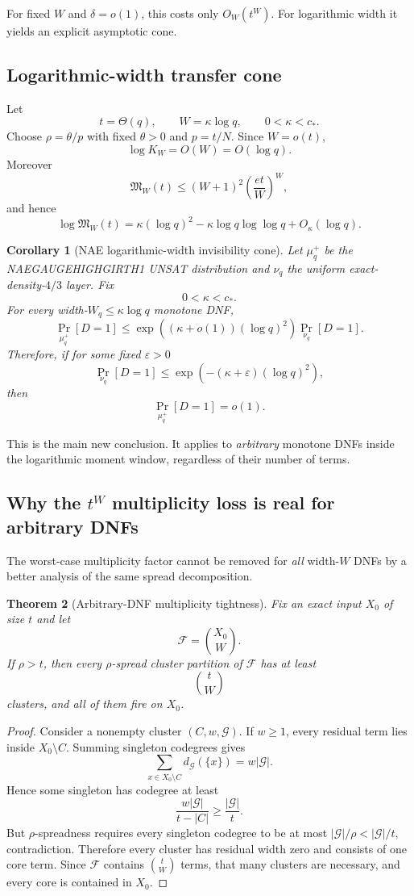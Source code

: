 \documentclass[11pt]{article}
\newtheorem{theorem}{Theorem}
\newtheorem{corollary}[theorem]{Corollary}
\begin{document}
For fixed $W$ and $\delta=o(1)$, this costs only $O_W(t^W)$. For logarithmic width it yields an explicit asymptotic cone.

\subsection{Logarithmic-width transfer cone}
Let
\[
t=\Theta(q),\qquad W=\kappa\log q,\qquad 0<\kappa<c_*.
\]
Choose $\rho=\theta/p$ with fixed $\theta>0$ and $p=t/N$. Since $W=o(t)$,
\[
\log K_W=O(W)=O(\log q).
\]
Moreover
\[
\mathfrak M_W(t)
\le
(W+1)^2\left(\frac{et}{W}\right)^W,
\]
and hence
\[
\boxed{
\log\mathfrak M_W(t)
=
\kappa(\log q)^2
-\kappa\log q\log\log q
+O_\kappa(\log q).
}
\]

\begin{corollary}[NAE logarithmic-width invisibility cone]
Let $\mu_q^+$ be the NAEGAUGEHIGHGIRTH1 UNSAT distribution and $\nu_q$ the uniform exact-density-$4/3$ layer. Fix
\[
0<\kappa<c_*.
\]
For every width-$W_q\le\kappa\log q$ monotone DNF,
\[
\boxed{
\Pr_{\mu_q^+}[D=1]
\le
\exp\!\left((\kappa+o(1))(\log q)^2\right)
\Pr_{\nu_q}[D=1].
}
\]
Therefore, if for some fixed $\varepsilon>0$
\[
\Pr_{\nu_q}[D=1]
\le
\exp\!\left(-(\kappa+\varepsilon)(\log q)^2\right),
\]
then
\[
\Pr_{\mu_q^+}[D=1]=o(1).
\]
\end{corollary}

This is the main new conclusion. It applies to \emph{arbitrary} monotone DNFs inside the logarithmic moment window, regardless of their number of terms.

\subsection{Why the $t^W$ multiplicity loss is real for arbitrary DNFs}
The worst-case multiplicity factor cannot be removed for \emph{all} width-$W$ DNFs by a better analysis of the same spread decomposition.

\begin{theorem}[Arbitrary-DNF multiplicity tightness]
Fix an exact input $X_0$ of size $t$ and let
\[
\mathcal F=\binom{X_0}{W}.
\]
If $\rho>t$, then every $\rho$-spread cluster partition of $\mathcal F$ has at least
\[
\binom tW
\]
clusters, and all of them fire on $X_0$.
\end{theorem}
\begin{proof}
Consider a nonempty cluster $(C,w,\mathcal G)$. If $w\ge1$, every residual term lies inside $X_0\setminus C$. Summing singleton codegrees gives
\[
\sum_{x\in X_0\setminus C}d_{\mathcal G}(\{x\})=w|\mathcal G|.
\]
Hence some singleton has codegree at least
\[
\frac{w|\mathcal G|}{t-|C|}
\ge\frac{|\mathcal G|}{t}.
\]
But $\rho$-spreadness requires every singleton codegree to be at most $|\mathcal G|/\rho<|\mathcal G|/t$, contradiction. Therefore every cluster has residual width zero and consists of one core term. Since $\mathcal F$ contains $\binom tW$ terms, that many clusters are necessary, and every core is contained in $X_0$.
\end{proof}
\end{document}
